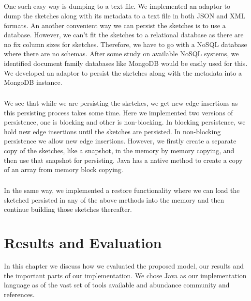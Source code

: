 \documentclass[12pt]{report}
\numberwithin{figure}{section}
\numberwithin{table}{section}
\begin{document}
\paragraph{}

One such easy way is dumping to a text file.  We implemented an adaptor to dump the sketches along with its metadata to a text file in both JSON and XML formats. An another convenient way we can persist the sketches is to use a database. However, we can’t fit the sketches to a relational database as there are no fix column sizes for sketches. Therefore, we have to go with a NoSQL database where there are no schemas. After some study on available NoSQL systems, we identified document family databases like MongoDB would be easily used for this. We developed an adaptor to persist the sketches along with the metadata into a MongoDB instance.

\paragraph{}

We see that while we are persisting the sketches, we get new edge insertions as this persisting process takes some time. Here we implemented two versions of persistence, one is blocking and other is non-blocking. In blocking persistence, we hold new edge insertions until the sketches are persisted. In non-blocking persistence we allow new edge insertions. However, we firstly create a separate copy of the sketches, like a snapshot,  in the memory by memory copying, and then use that snapshot for persisting. Java has a native method to create a copy of an array from memory block copying. 

\paragraph{}

In the same way, we implemented a restore functionality where we can load the sketched persisted in any of the above methods into the memory and then continue building those sketches thereafter.

\chapter{Results and Evaluation}
In this chapter we discuss how we evaluated the proposed model, our results and the important parts of our implementation. We chose Java as our implementation language as of the vast set of tools available and abundance community and references.
\end{document}
